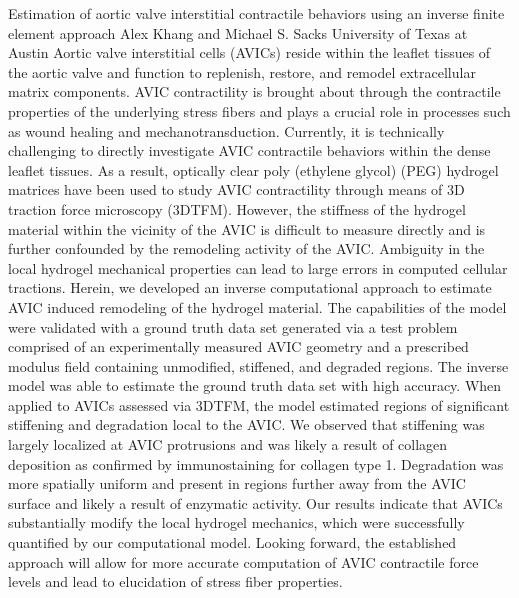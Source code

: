 \begin{addmargin}[2em]{0em}
\vspace{1.5ex}
\abs
{Estimation of aortic valve interstitial contractile behaviors using an inverse finite element approach}
{Alex Khang and Michael S. Sacks}
{University of Texas at Austin}
{Aortic valve interstitial cells (AVICs) reside within the leaflet tissues of the aortic valve and function to replenish, restore, and remodel extracellular matrix components. AVIC contractility is brought about through the contractile properties of the underlying stress fibers and plays a crucial role in processes such as wound healing and mechanotransduction. Currently, it is technically challenging to directly investigate AVIC contractile behaviors within the dense leaflet tissues. As a result, optically clear poly (ethylene glycol) (PEG) hydrogel matrices have been used to study AVIC contractility through means of 3D traction force microscopy (3DTFM). However, the stiffness of the hydrogel material within the vicinity of the AVIC is difficult to measure directly and is further confounded by the remodeling activity of the AVIC. Ambiguity in the local hydrogel mechanical properties can lead to large errors in computed cellular tractions. Herein, we developed an inverse computational approach to estimate AVIC induced remodeling of the hydrogel material. The capabilities of the model were validated with a ground truth data set generated via a test problem comprised of an experimentally measured AVIC geometry and a prescribed modulus field containing unmodified, stiffened, and degraded regions. The inverse model was able to estimate the ground truth data set with high accuracy. When applied to AVICs assessed via 3DTFM, the model estimated regions of significant stiffening and degradation local to the AVIC. We observed that stiffening was largely localized at AVIC protrusions and was likely a result of collagen deposition as confirmed by immunostaining for collagen type 1. Degradation was more spatially uniform and present in regions further away from the AVIC surface and likely a result of enzymatic activity. Our results indicate that AVICs substantially modify the local hydrogel mechanics, which were successfully quantified by our computational model. Looking forward, the established approach will allow for more accurate computation of AVIC contractile force levels and lead to elucidation of stress fiber properties.}



\end{addmargin}
